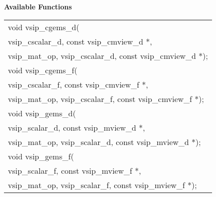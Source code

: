 \\\cvsiplh
\\ \hspace*{.8cm} \vspace*{.1cm} \textbf{Available Functions }
\\ \hspace*{1.1cm} {
\ttfamily
\begin{tabular}[H]{l}
void vsip\_cgems\_d(\\*\hspace{.6cm}vsip\_cscalar\_d, const vsip\_cmview\_d *,\\*\hspace{.6cm}vsip\_mat\_op, vsip\_cscalar\_d, const vsip\_cmview\_d *);\\
void vsip\_cgems\_f(\\*\hspace{.6cm}vsip\_cscalar\_f, const vsip\_cmview\_f *,\\*\hspace{.6cm}vsip\_mat\_op, vsip\_cscalar\_f, const vsip\_cmview\_f *);\\
void vsip\_gems\_d(\\*\hspace{.6cm}vsip\_scalar\_d, const vsip\_mview\_d *,\\*\hspace{.6cm}vsip\_mat\_op, vsip\_scalar\_d, const vsip\_mview\_d *);\\
void vsip\_gems\_f(\\*\hspace{.6cm}vsip\_scalar\_f, const vsip\_mview\_f *,\\*\hspace{.6cm}vsip\_mat\_op, vsip\_scalar\_f, const vsip\_mview\_f *);\\
\end{tabular}
}
\\\pyjvsiph
{}
